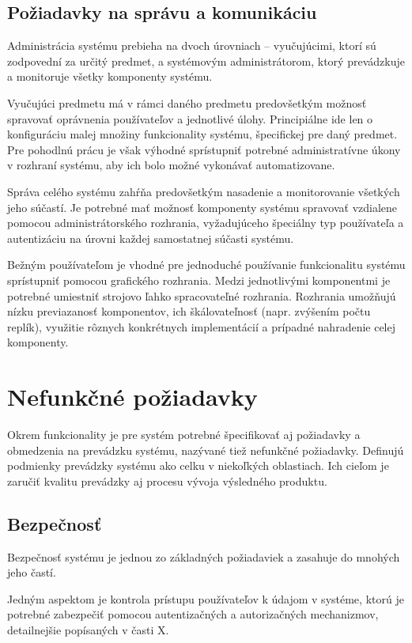\documentclass[
  digital, %
  twoside, %
  table,   %
  lof,     %
  lot,     %
]{fithesis3}
\begin{document}
\subsection{Požiadavky na správu a komunikáciu}

Administrácia systému prebieha na dvoch úrovniach -- vyučujúcimi, ktorí sú zodpovední za určitý predmet, a systémovým administrátorom, ktorý prevádzkuje a monitoruje všetky komponenty systému. 

Vyučujúci predmetu má v rámci daného predmetu predovšetkým možnosť spravovať oprávnenia používateľov a jednotlivé úlohy. Principiálne ide len o konfiguráciu malej množiny funkcionality systému, špecifickej pre daný predmet. Pre pohodlnú prácu je však výhodné sprístupniť potrebné administratívne úkony v rozhraní systému, aby ich bolo možné vykonávať automatizovane.

Správa celého systému zahŕňa predovšetkým nasadenie a monitorovanie všetkých jeho súčastí. Je potrebné mať možnosť komponenty systému spravovať vzdialene pomocou administrátorského rozhrania, vyžadujúceho špeciálny typ používateľa a autentizáciu na úrovni každej samostatnej súčasti systému.

Bežným používateľom je vhodné pre jednoduché používanie funkcionalitu systému sprístupniť pomocou grafického rozhrania. Medzi jednotlivými komponentmi je potrebné umiestniť strojovo ľahko spracovateľné rozhrania. Rozhrania umožňujú nízku previazanosť komponentov, ich škálovateľnosť (napr. zvýšením počtu replík), využitie rôznych konkrétnych implementácií a prípadné nahradenie celej komponenty.

\section{Nefunkčné požiadavky}

Okrem funkcionality je pre systém potrebné špecifikovať aj požiadavky a obmedzenia na prevádzku systému, nazývané tiež nefunkčné požiadavky. Definujú podmienky prevádzky systému ako celku v niekoľkých oblastiach. Ich cieľom je zaručiť kvalitu prevádzky aj procesu vývoja výsledného produktu.

\subsection{Bezpečnosť}
Bezpečnosť systému je jednou zo základných požiadaviek a zasahuje do mnohých jeho častí.

Jedným aspektom je kontrola prístupu používateľov k údajom v systéme, ktorú je potrebné zabezpečiť pomocou autentizačných a autorizačných mechanizmov, detailnejšie popísaných v časti X. %
\end{document}
